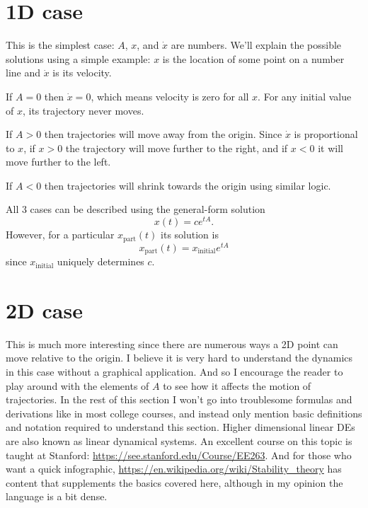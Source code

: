 \documentclass[11pt, oneside]{article}   	%
\begin{document}
\section{1D case}

This is the simplest case: $A$, $x$, and $\dot{x}$ are numbers.
We'll explain the possible solutions using a simple example: $x$ is the location of some point on a number line and $\dot{x}$ is its velocity.

If $A = 0$ then $\dot{x} = 0$, which means velocity is zero for all $x$.
For any initial value of $x$, its trajectory never moves.

If $A > 0$ then trajectories will move away from the origin.
Since $\dot{x}$ is proportional to $x$,
if $x > 0$ the trajectory will move further to the right, and if $x < 0$ it will move further to the left.

If $A < 0$ then trajectories will shrink towards the origin using similar logic.

All 3 cases can be described using the general-form solution
\begin{equation}
x(t) = ce^{tA} .
\end{equation}
However, for a particular $x_\mathrm{part}(t)$ its solution is
\begin{equation}
x_\mathrm{part}(t) = x_\mathrm{initial} e^{tA}
\end{equation}
since $x_\mathrm{initial}$ uniquely determines $c$.


\section{2D case}

This is much more interesting since there are numerous ways a 2D point can move relative to the origin.
I believe it is very hard to understand the dynamics in this case without a graphical application.
And so I encourage the reader to play around with the elements of $A$ to see how it affects the motion of trajectories.
In the rest of this section I won't go into troublesome formulas and derivations like in most college courses,
and instead only mention basic definitions and notation required to understand this section.
Higher dimensional linear DEs are also known as linear dynamical systems.
An excellent course on this topic is taught at Stanford: \url{https://see.stanford.edu/Course/EE263}.
And for those who want a quick infographic,
\url{https://en.wikipedia.org/wiki/Stability_theory} has content that supplements the basics covered here,
although in my opinion the language is a bit dense. \\
\end{document}
